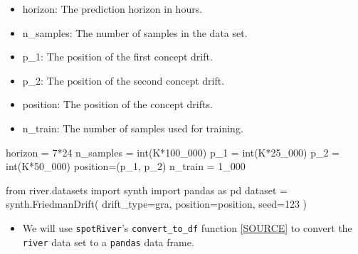 \documentclass[
  letterpaper,
  DIV=11,
  numbers=noendperiod]{scrreprt}
\newenvironment{Shaded}{\begin{snugshade}}{\end{snugshade}}
\newcommand{\BuiltInTok}[1]{\textcolor[rgb]{0.00,0.23,0.31}{#1}}
\newcommand{\DecValTok}[1]{\textcolor[rgb]{0.68,0.00,0.00}{#1}}
\newcommand{\ImportTok}[1]{\textcolor[rgb]{0.00,0.46,0.62}{#1}}
\newcommand{\NormalTok}[1]{\textcolor[rgb]{0.00,0.23,0.31}{#1}}
\newcommand{\OperatorTok}[1]{\textcolor[rgb]{0.37,0.37,0.37}{#1}}
\newcommand{\StringTok}[1]{\textcolor[rgb]{0.13,0.47,0.30}{#1}}
\providecommand{\tightlist}{%
  \setlength{\itemsep}{0pt}\setlength{\parskip}{0pt}}\usepackage{longtable,booktabs,array}
\begin{document}
\begin{itemize}
\tightlist
\item
  horizon: The prediction horizon in hours.
\item
  n\_samples: The number of samples in the data set.
\item
  p\_1: The position of the first concept drift.
\item
  p\_2: The position of the second concept drift.
\item
  position: The position of the concept drifts.
\item
  n\_train: The number of samples used for training.
\end{itemize}

\begin{Shaded}
\begin{Highlighting}[]
\NormalTok{horizon }\OperatorTok{=} \DecValTok{7}\OperatorTok{*}\DecValTok{24}
\NormalTok{n\_samples }\OperatorTok{=} \BuiltInTok{int}\NormalTok{(K}\OperatorTok{*}\DecValTok{100\_000}\NormalTok{)}
\NormalTok{p\_1 }\OperatorTok{=} \BuiltInTok{int}\NormalTok{(K}\OperatorTok{*}\DecValTok{25\_000}\NormalTok{)}
\NormalTok{p\_2 }\OperatorTok{=} \BuiltInTok{int}\NormalTok{(K}\OperatorTok{*}\DecValTok{50\_000}\NormalTok{)}
\NormalTok{position}\OperatorTok{=}\NormalTok{(p\_1, p\_2)}
\NormalTok{n\_train }\OperatorTok{=} \DecValTok{1\_000}
\end{Highlighting}
\end{Shaded}

\begin{Shaded}
\begin{Highlighting}[]
\ImportTok{from}\NormalTok{ river.datasets }\ImportTok{import}\NormalTok{ synth}
\ImportTok{import}\NormalTok{ pandas }\ImportTok{as}\NormalTok{ pd}
\NormalTok{dataset }\OperatorTok{=}\NormalTok{ synth.FriedmanDrift(}
\NormalTok{   drift\_type}\OperatorTok{=}\StringTok{\textquotesingle{}gra\textquotesingle{}}\NormalTok{,}
\NormalTok{   position}\OperatorTok{=}\NormalTok{position,}
\NormalTok{   seed}\OperatorTok{=}\DecValTok{123}
\NormalTok{)}
\end{Highlighting}
\end{Shaded}

\begin{itemize}
\tightlist
\item
  We will use \texttt{spotRiver}'s \texttt{convert\_to\_df} function
  \href{https://github.com/sequential-parameter-optimization/spotRiver/blob/main/src/spotRiver/utils/data_conversion.py}{{[}SOURCE{]}}
  to convert the \texttt{river} data set to a \texttt{pandas} data
  frame.
\end{itemize}
\end{document}
